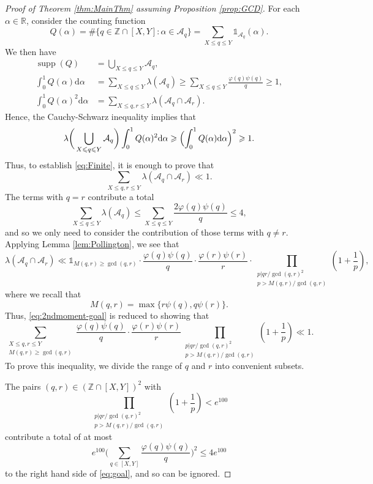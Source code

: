 \documentclass[12pt]{amsart}
\numberwithin{equation}{section}
\theoremstyle{definition}
\theoremstyle{remark}
\newcommand{\Z}{\mathbb{Z}}
\newcommand{\R}{\mathbb{R}}
\newcommand{\CA}{\mathcal{A}}
\newcommand{\un}{\mathds{1}}
\newcommand{\dee}{\mathrm{d}}
\DeclareMathOperator{\supp}{supp}
\renewcommand{\phi}{\varphi}
\renewcommand{\le}{\leqslant}
\renewcommand{\ge}{\geqslant}
\begin{document}
\begin{proof}[Proof of Theorem \ref{thm:MainThm} assuming Proposition \ref{prop:GCD}]
For each $\alpha\in\R$, consider the counting function
\[  
Q(\alpha)=\#\{q\in\Z\cap [X,Y]: \alpha\in\CA_q\} = \sum_{X\le q\le Y} \un_{\CA_q}(\alpha).
\]
We then have
\begin{align*}
\supp(Q)&=\bigcup_{X\le q\le Y}\CA_q,\\
\int_0^1 Q(\alpha) \dee\alpha &= \sum_{X\le q\le Y}\lambda(\CA_q) \ge \sum_{X\le q\le Y} \frac{\phi(q)\psi(q)}{q} \ge 1 ,\\
\int_0^1 Q(\alpha)^2 \dee\alpha &= \sum_{X\le q,r \le Y}\lambda(\CA_q\cap \CA_r)  .
\end{align*}
Hence, the Cauchy-Schwarz inequality implies that
\[
\lambda\bigg(\bigcup_{X\le q\le Y}\CA_q\bigg)\int_0^1 Q(\alpha)^2\dee\alpha 
\ge\Bigl(\int_0^1Q(\alpha)\dee \alpha\Bigr)^2\ge1.
\]
Thus, to establish \eqref{eq:Finite}, it is enough to prove that
\begin{equation}\label{eq:2ndmoment-goal}
\sum_{X\le q,r\le Y} \lambda(\CA_q\cap \CA_r) \ll  1 .
\end{equation}
The terms with $q=r$ contribute a total
\[
\sum_{X\le q\le Y}\lambda(\CA_q)\le \sum_{X\le q\le Y} \frac{2\phi(q)\psi(q)}{q}\le 4,
\]
and so we only need to consider the contribution of those terms with $q\ne r$. Applying Lemma \ref{lem:Pollington}, we see that 
\[
\lambda(\CA_q\cap \CA_r)\ll 
	\un_{M(q,r)\ge \gcd(q,r)}\cdot \frac{\phi(q)\psi(q)}{q}\cdot \frac{\phi(r)\psi(r)}{r}\cdot 
	\prod_{\substack{p|qr/\gcd(q,r)^2 \\ p>M(q,r)/\gcd(q,r)}} \left(1+\frac{1}{p}\right) ,
\]
where we recall that
\[
M(q,r)=\max\{r\psi(q),q\psi(r)\}.
\]
Thus, \eqref{eq:2ndmoment-goal} is reduced to showing that
\begin{equation}\label{eq:goal}
	\sum_{\substack{X\le q,r\le Y \\ M(q,r)\ge\gcd(q,r) }} 
		\frac{\phi(q)\psi(q)}{q} \cdot\frac{\phi(r)\psi(r)}{r}
			 \prod_{\substack{p|qr/\gcd(q,r)^2 \\ p>M(q,r)/\gcd(q,r)}}\left(1+\frac{1}{p}\right) \ll 1.
\end{equation}
To prove this inequality, we divide the range of $q$ and $r$ into convenient subsets. 

The pairs $(q,r)\in (\Z\cap [X,Y])^2$ with
\[
 \prod_{\substack{p|qr/\gcd(q,r)^2 \\ p>M(q,r)/\gcd(q,r)}}\left(1+\frac{1}{p}\right) < e^{100} 
\]
contribute a total of at most
\[
e^{100}\bigg(\sum_{q\in [X,Y] } 
		\frac{\phi(q)\psi(q)}{q}\bigg)^2
		\le 4e^{100} 
\]
to the right hand side of \eqref{eq:goal}, and so can be ignored. 


\end{proof}
\end{document}

